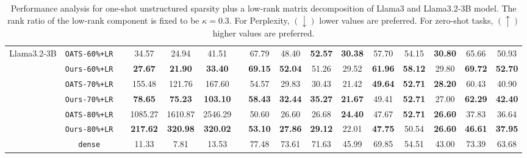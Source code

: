 \begin{table}[h!]
{\begin{tabular}{ccc@{\hskip 8pt}cccc@{\hskip 8pt}ccccccccc}
\midrule
\multirow{7.5}{*}{Llama3.2-3B} 
&\texttt{OATS-60\%+LR}       && 34.57 & 24.94 & 41.51 && 67.79 & 48.40 & \textbf{52.57} & \textbf{30.38} & 57.70 & 54.15 & \textbf{30.80} & 65.66 & 50.93 \\
&\texttt{Ours-60\%+LR}       && \textbf{27.67} & \textbf{21.90} & \textbf{33.40} && \textbf{69.15} & \textbf{52.04} & 51.26 & 29.52 & \textbf{61.96} & \textbf{58.12} & 29.80 & \textbf{69.72} & \textbf{52.70} \\
\cmidrule(rl){2-2}
&\texttt{OATS-70\%+LR}       &&  155.48 & 121.76 & 167.60 && 54.57 & 29.83 & 30.43 & 21.42 & \textbf{49.64} & \textbf{52.71} & \textbf{28.20} & 60.43 & 40.90 \\
&\texttt{Ours-70\%+LR}       && \textbf{78.65} & \textbf{75.23} & \textbf{103.10} && \textbf{58.43} & \textbf{32.44} & \textbf{35.27} & \textbf{21.67} & 49.41 & \textbf{52.71} & 27.00 & \textbf{62.29} & \textbf{42.40} \\
\cmidrule(rl){2-2}
&\texttt{OATS-80\%+LR}       && 1085.27 & 1610.87 & 2546.29 && 50.60 & 26.60 & 26.68 & \textbf{24.40} & 47.67 & \textbf{52.71} & \textbf{26.60} & 37.83 & 36.64 \\
&\texttt{Ours-80\%+LR}       && \textbf{217.62} & \textbf{320.98} & \textbf{320.02} && \textbf{53.10} & \textbf{27.86} & \textbf{29.12} & 22.01 & \textbf{47.75} & 50.54 & \textbf{26.60} & \textbf{46.61} & \textbf{37.95} \\
\cmidrule(rl){2-2}
&\texttt{dense}               && 11.33 & 7.81 & 13.53 && 77.48 & 73.61 & 71.63 & 45.99 & 69.85 & 54.51 & 43.00 & 73.39 & 63.68 \\

\bottomrule
\end{tabular}
}
\vspace{2pt}
\caption{Performance analysis for one-shot unstructured sparsity plus a low-rank matrix decomposition of Llama3 and Llama3.2-3B model. The rank ratio of the low-rank component is fixed to be $\kappa=0.3$. For Perplexity, $(\downarrow)$ lower values are preferred. For zero-shot tasks, $(\uparrow)$ higher values are preferred.}
\label{tab:supp-slr-unstructured}
\end{table}

